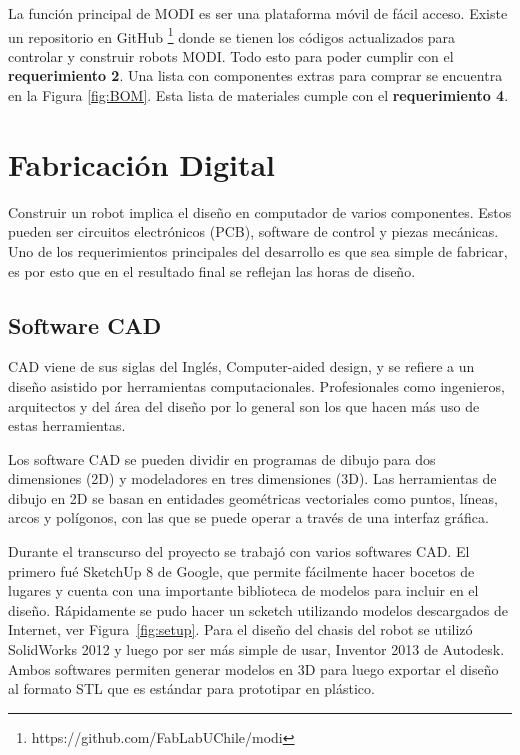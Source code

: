 La función principal de MODI es ser una plataforma móvil de fácil acceso. Existe un repositorio en GitHub  \footnote{https://github.com/FabLabUChile/modi} donde se tienen los códigos actualizados para controlar y construir robots MODI. Todo esto para poder cumplir con el \textbf{requerimiento 2}. Una lista con componentes extras para comprar se encuentra en la Figura \ref{fig:BOM}. Esta lista de materiales cumple con el \textbf{requerimiento 4}.


\section{Fabricación Digital}

Construir un robot implica el diseño en computador de varios componentes. Estos pueden ser circuitos electrónicos (PCB), software de control y piezas mecánicas. Uno de los requerimientos principales del desarrollo es que sea simple de fabricar, es por esto que en el resultado final se reflejan las horas de diseño.




\subsection{Software CAD}

CAD viene de sus siglas del Inglés, Computer-aided design, y se refiere a un diseño asistido por herramientas computacionales. Profesionales como ingenieros, arquitectos y del área del diseño por lo general son los que hacen más uso de estas herramientas.

Los software CAD se pueden dividir en programas de dibujo para dos dimensiones (2D) y modeladores en tres dimensiones (3D). Las herramientas de dibujo en 2D se basan en entidades geométricas vectoriales como puntos, líneas, arcos y polígonos, con las que se puede operar a través de una interfaz gráfica.

Durante el transcurso del proyecto se trabajó con varios softwares CAD. El primero fué SketchUp 8 de Google, que permite fácilmente hacer bocetos de lugares y cuenta con una importante biblioteca de modelos para incluir en el diseño. Rápidamente se pudo hacer un scketch utilizando modelos descargados de Internet, ver Figura~\ref{fig:setup}. Para el diseño del chasis del robot se utilizó SolidWorks 2012 y luego por ser más simple de usar, Inventor 2013 de Autodesk. Ambos softwares permiten generar modelos en 3D para luego exportar el diseño al formato STL que es estándar para prototipar en plástico. 




